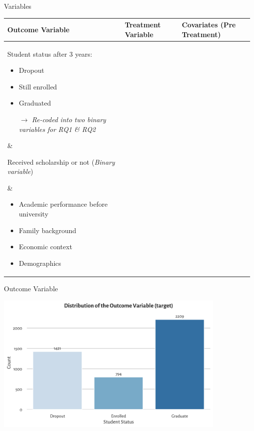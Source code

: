 \documentclass[aspectratio=169]{beamer}
\begin{document}
\begin{frame}{Variables}
\centering
\renewcommand{\arraystretch}{1.4}

\begin{tabularx}{\textwidth}{X | X | X}
\textbf{Outcome Variable} & \textbf{Treatment Variable} & \textbf{Covariates}  (Pre Treatment)\\[0.5ex]
\hline \hline 
Student status after 3 years: 
\parbox[t]{4cm}{\vspace{-12pt} \begin{itemize}[label=--,leftmargin=1.2em,itemsep=1pt,topsep=2pt]
    \item Dropout
    \item Still enrolled
    \item Graduated
    \item[$\rightarrow$] \textit{Re-coded into two binary variables for RQ1 \& RQ2}
\end{itemize}} &

Received scholarship or not (\textit{Binary variable}) 

& \vspace{-27pt}
\parbox[t]{4cm}{\begin{itemize}[label=--,leftmargin=1.2em,itemsep=1pt,topsep=2pt]
    \item Academic performance before university
    \item Family background
    \item Economic context
    \item Demographics
\end{itemize}}

\end{tabularx}
\end{frame}

\begin{frame}{Outcome Variable}
	\begin{center}
     \includegraphics[width=0.85\textwidth]{Tex_Pictures/Graph1.png}
     \end{center}
\end{frame}
\end{document}
